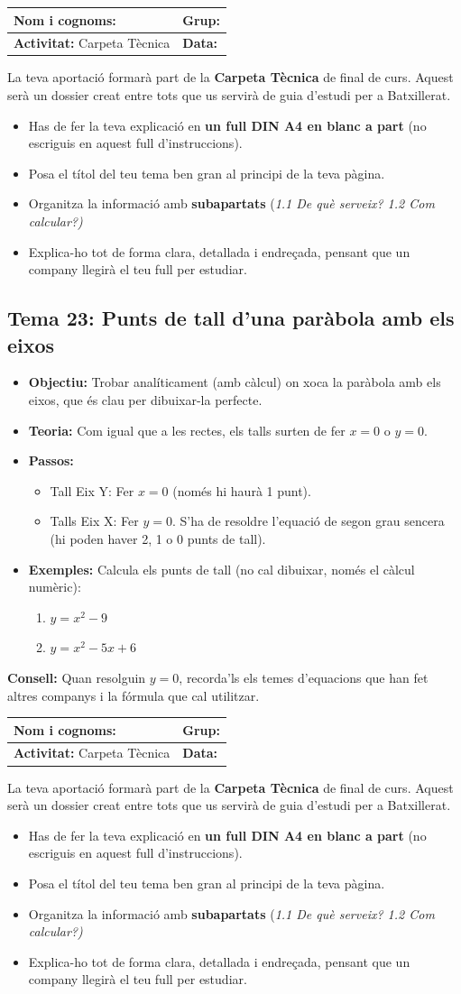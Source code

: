 \documentclass[12pt,a4paper]{article}
\newcommand{\introcomuna}{
    \begin{tcolorbox}[colback=gray!5,colframe=gray!50!black,title=\textbf{La Carpeta Tècnica de Matemàtiques}]
    La teva aportació formarà part de la \textbf{Carpeta Tècnica} de final de curs. Aquest serà un dossier creat entre tots que us servirà de guia d'estudi per a Batxillerat.
    
    \begin{itemize}[label=\textbullet, leftmargin=*]
        \item Has de fer la teva explicació en \textbf{un full DIN A4 en blanc a part} (no escriguis en aquest full d'instruccions).
        \item Posa el títol del teu tema ben gran al principi de la teva pàgina.
        \item Organitza la informació amb \textbf{subapartats} (\textit{1.1 De què serveix? 1.2 Com calcular?)}
        \item Explica-ho tot de forma clara, detallada i endreçada, pensant que un company llegirà el teu full per estudiar.
    \end{itemize}
    \end{tcolorbox}
    \vspace{0.1cm}
}
\newcommand{\capcaleraalumne}[1]{
    \begingroup
    \renewcommand{\arraystretch}{2.2}
    \begin{tabularx}{\textwidth}{|X|p{4cm}|}
    \hline
    \textbf{Nom i cognoms:} & \textbf{Grup:} \\ \hline
    \textbf{Activitat:} Carpeta Tècnica & \textbf{Data:} \\ \hline
    \end{tabularx}
    \endgroup
    \vspace{0.4cm}
}
\begin{document}
\newpage
\capcaleraalumne{23}
\introcomuna
\subsection*{Tema 23: Punts de tall d'una paràbola amb els eixos}
\begin{itemize}[label=\textbullet]
    \item \textbf{Objectiu:} Trobar analíticament (amb càlcul) on xoca la paràbola amb els eixos, que és clau per dibuixar-la perfecte.
    \item \textbf{Teoria:} Com igual que a les rectes, els talls surten de fer $x=0$ o $y=0$.
    \item \textbf{Passos:} 
        \begin{itemize}
            \item Tall Eix Y: Fer $x=0$ (només hi haurà 1 punt).
            \item Talls Eix X: Fer $y=0$. S'ha de resoldre l'equació de segon grau sencera (hi poden haver 2, 1 o 0 punts de tall).
        \end{itemize}
    \item \textbf{Exemples:} Calcula els punts de tall (no cal dibuixar, només el càlcul numèric):
    \begin{enumerate}[label=\alph*)]
        \item $y = x^2 - 9$
        \item $y = x^2 - 5x + 6$
    \end{enumerate}
\end{itemize}
\vfill
\noindent\textbf{Consell:} Quan resolguin $y=0$, recorda'ls els temes d'equacions que han fet altres companys i la fórmula que cal utilitzar.

\newpage
\capcaleraalumne{24}
\introcomuna
\end{document}
